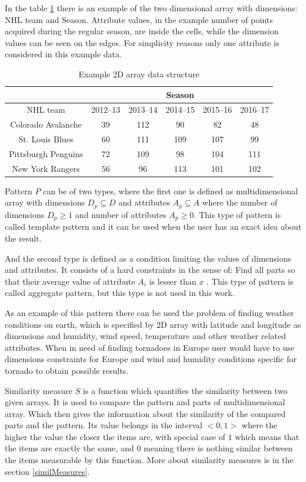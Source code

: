 In the table \ref{tab1} there is an example of the two dimensional array with dimensions: NHL team and Season. Attribute values, in the example number of points acquired during the regular season, are inside the cells, while the dimension values can be seen on the edges. For simplicity reasons only one attribute is considered in this example data. 
\begin{table}
\centering
\begin{tabular} {| c | c | c | c | c | c |}
\cline{2-6}
\multicolumn{1}{c|}{} & \multicolumn{5}{|c|}{Season} \\
\hline
NHL team & 2012--13 & 2013--14 & 2014--15 & 2015--16 & 2016--17\\
\hline
Colorado Avalanche & 39 & 112 & 90 & 82 & 48 \\
\hline
St. Louis Blues & 60 & 111 & 109 & 107 & 99 \\
\hline
Pittsburgh Penguins & 72 & 109 & 98 & 104 & 111 \\
\hline
New York Rangers & 56 & 96 & 113 & 101 & 102 \\
\hline

\end{tabular}
\caption{Example 2D array data structure}
\label{tab1}
\end{table}

Pattern $P$ can be of two types, where the first one is defined as multidimensional array with dimensions $D_p \subseteq D$ and attributes $A_p \subseteq A$ where the number of dimensions $D_p \geq 1$ and number of attributes $A_p \geq 0$.
This type of pattern is called template pattern and it can be used when the user has an exact idea about the result.

And the second type is defined as a condition limiting the values of dimensions and attributes. It consists of a hard constraints in the sense of: Find all parts so that their average value of attribute $A_i$ is lesser than $x$ . This type of pattern is called aggregate pattern, but this type is not used in this work.

As an example of this pattern there can be used the problem of finding weather conditions on earth, which is specified by 2D array with latitude and longitude as dimensions and humidity, wind speed, temperature and other weather related attributes. When in need of finding tornadoes in Europe user would have to use dimensions constraints for Europe and wind and humidity conditions specific for tornado to obtain possible results.

Similarity measure $S$ is a function which quantifies the similarity between two given arrays. 
It is used to compare the pattern and parts of multidimensional array. Which then gives the information about the similarity of the compared parts and the pattern. Its value belongs in the interval $<0, 1>$ where the higher the value the closer the items are, with special case of $1$ which means that the items are exactly the same, and $0$ meaning there is nothing similar between the items measurable by this function. More about similarity measures is in the section \ref{similMeasures}.

